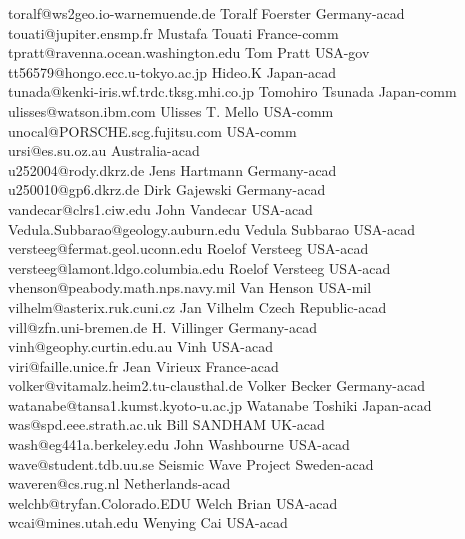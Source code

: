 \begin{tabbing}
toralf@ws2geo.io-warnemuende.de \> Toralf Foerster \> Germany-acad\\
touati@jupiter.ensmp.fr \> Mustafa Touati \> France-comm\\
tpratt@ravenna.ocean.washington.edu \> Tom Pratt \> USA-gov\\
tt56579@hongo.ecc.u-tokyo.ac.jp \> Hideo.K \> Japan-acad\\
tunada@kenki-iris.wf.trdc.tksg.mhi.co.jp  \> Tomohiro Tsunada \> Japan-comm\\
ulisses@watson.ibm.com \> Ulisses T. Mello \> USA-comm\\
unocal@PORSCHE.scg.fujitsu.com \> \> USA-comm\\
ursi@es.su.oz.au \> \> Australia-acad\\
u252004@rody.dkrz.de \> Jens Hartmann \> Germany-acad\\
u250010@gp6.dkrz.de \> Dirk Gajewski \> Germany-acad\\
vandecar@clrs1.ciw.edu  \> John Vandecar \> USA-acad\\
Vedula.Subbarao@geology.auburn.edu \> Vedula Subbarao \> USA-acad\\
versteeg@fermat.geol.uconn.edu \> Roelof Versteeg \> USA-acad\\
versteeg@lamont.ldgo.columbia.edu \> Roelof Versteeg \> USA-acad\\
vhenson@peabody.math.nps.navy.mil \> Van Henson \> USA-mil\\
vilhelm@asterix.ruk.cuni.cz \> Jan Vilhelm \> Czech Republic-acad\\
vill@zfn.uni-bremen.de \>  H. Villinger \> Germany-acad\\
vinh@geophy.curtin.edu.au \> Vinh \> USA-acad\\
viri@faille.unice.fr \> Jean Virieux \> France-acad\\
volker@vitamalz.heim2.tu-clausthal.de \> Volker Becker \> Germany-acad\\
watanabe@tansa1.kumst.kyoto-u.ac.jp \> Watanabe Toshiki \> Japan-acad\\
was@spd.eee.strath.ac.uk \> Bill SANDHAM \> UK-acad\\
wash@eg441a.berkeley.edu \> John Washbourne \> USA-acad\\
wave@student.tdb.uu.se \> Seismic Wave Project \> Sweden-acad\\
waveren@cs.rug.nl \> \> Netherlands-acad\\
welchb@tryfan.Colorado.EDU \> Welch Brian \> USA-acad\\
wcai@mines.utah.edu \> Wenying Cai \>  USA-acad\\

\end{tabbing}
